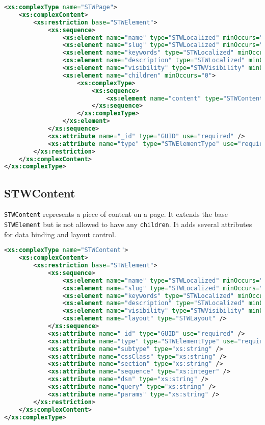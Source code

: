 \begin{lstlisting}[language=XML,caption={STWPage Type Definition}]
<xs:complexType name="STWPage">
    <xs:complexContent>
        <xs:restriction base="STWElement">
            <xs:sequence>
                <xs:element name="name" type="STWLocalized" minOccurs="1" />
                <xs:element name="slug" type="STWLocalized" minOccurs="1" />
                <xs:element name="keywords" type="STWLocalized" minOccurs="0" />
                <xs:element name="description" type="STWLocalized" minOccurs="0" />
                <xs:element name="visibility" type="STWVisibility" minOccurs="0" />
                <xs:element name="children" minOccurs="0">
                    <xs:complexType>
                        <xs:sequence>
                            <xs:element name="content" type="STWContent" minOccurs="0" maxOccurs="unbounded"/>
                        </xs:sequence>
                    </xs:complexType>
                </xs:element>
            </xs:sequence>
            <xs:attribute name="_id" type="GUID" use="required" />
            <xs:attribute name="type" type="STWElementType" use="required" />
        </xs:restriction>
    </xs:complexContent>
</xs:complexType>
\end{lstlisting}

\subsection{STWContent}

\texttt{STWContent} represents a piece of content on a page. It extends the base \texttt{STWElement} but is not allowed to have any \texttt{children}. It adds several attributes for data binding and layout control.

\begin{lstlisting}[language=XML,caption={STWContent Type Definition}]
<xs:complexType name="STWContent">
    <xs:complexContent>
        <xs:restriction base="STWElement">
            <xs:sequence>
                <xs:element name="name" type="STWLocalized" minOccurs="1" />
                <xs:element name="slug" type="STWLocalized" minOccurs="1" />
                <xs:element name="keywords" type="STWLocalized" minOccurs="0" />
                <xs:element name="description" type="STWLocalized" minOccurs="0" />
                <xs:element name="visibility" type="STWVisibility" minOccurs="0" />
                <xs:element name="layout" type="STWLayout" />
            </xs:sequence>
            <xs:attribute name="_id" type="GUID" use="required" />
            <xs:attribute name="type" type="STWElementType" use="required" fixed="Content" />
            <xs:attribute name="subtype" type="xs:string" />
            <xs:attribute name="cssClass" type="xs:string" />
            <xs:attribute name="section" type="xs:string" />
            <xs:attribute name="sequence" type="xs:integer" />
            <xs:attribute name="dsn" type="xs:string" />
            <xs:attribute name="query" type="xs:string" />
            <xs:attribute name="params" type="xs:string" />
        </xs:restriction>
    </xs:complexContent>
</xs:complexType>
\end{lstlisting}

